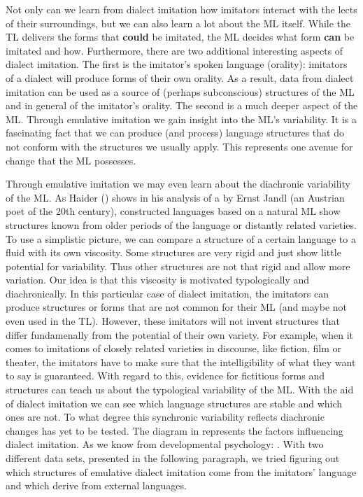 \documentclass[output=paper]{LSP/langsci}
\begin{document}
Not only can we learn from dialect imitation how imitators interact with the lects of their surroundings, but we can also learn a lot about the ML itself. While the TL delivers the forms that \textbf{could} be imitated, the ML decides what form \textbf{can} be imitated and how.  Furthermore, there are two additional interesting aspects of dialect imitation. The first is the imitator’s spoken language (orality): imitators of a dialect will produce forms of their own orality. As a result, data from dialect imitation can be used as a source of (perhaps subconscious) structures of the ML and in general of the imitator’s orality. The second is a much deeper aspect of the ML. Through emulative imitation we gain insight into the ML’s variability. It is a fascinating fact that we can produce (and process) language structures that do not conform with the structures we usually  apply. This  represents one avenue for change that the ML possesses. 

Through emulative imitation we may even learn about the diachronic variability of the ML. As Haider (\citeyear[135]{haider_poetenpidgin_2007}) shows in his analysis of a  by Ernst Jandl (an Austrian poet of the 20th century), constructed languages based on a natural ML show structures known from older periods of the language or distantly related varieties. To use a simplistic picture, we can compare a structure of a certain language to a fluid with its own viscosity. Some structures are very rigid and just show little potential for variability. Thus other structures are not that rigid and allow more variation. Our idea is that this viscosity is motivated typologically and diachronically. In this particular case of dialect imitation, the imitators can produce structures or forms that are not common for their ML (and maybe not even used in the TL). However, these imitators will not invent structures that differ fundamenally from the potential of their own variety. For example, when it comes to imitations of closely related varieties in discourse, like fiction, film or theater, the imitators have to make sure that the intelligibility of what they want to say is guaranteed.
With regard to this, evidence for fictitious forms and structures can teach us about the typological variability of the ML. With the aid of dialect imitation we can see which language structures are stable and which ones are not. To what degree this synchronic variability reflects diachronic changes has yet to be tested. The diagram in   represents the factors influencing dialect imitation. As we know from developmental psychology:  \citep[2]{uzgiris_two_1981}. With two different data sets, presented in the following paragraph, we tried figuring out which structures of emulative dialect imitation come from the imitators' language and which derive from external languages.
\end{document}
